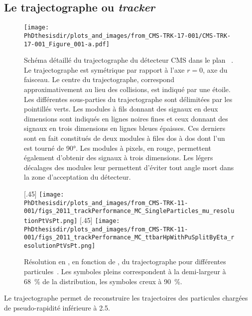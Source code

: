 \subsection{Le trajectographe ou \emph{tracker}}\label{chapter-LHC-section-CMS-subsec-tracker}
\begin{figure}[p]
\centering
\texttt{[image: \\PhDthesisdir/plots\_and\_images/from\_CMS-TRK-17-001/CMS-TRK-17-001\_Figure\_001-a.pdf]}
\caption[Schéma détaillé du trajectographe du détecteur CMS.]{Schéma détaillé du trajectographe du détecteur CMS dans le plan ~\cite{CMS-TRK-11-001,CMS-TRK-17-001}. Le trajectographe est symétrique par rapport à l'axe $r=0$, axe du faisceau. Le centre du trajectographe, correspond approximativement au lieu des collisions, est indiqué par une étoile. Les différentes sous-parties du trajectographe sont délimitées par les pointillés verts. Les modules à fils donnant des signaux en deux dimensions sont indiqués en lignes noires fines et ceux donnant des signaux en trois dimensions en lignes bleues épaisses. Ces derniers sont en fait constitués de deux modules à files dos à dos dont l'un est tourné de \ang{90}. Les modules à pixels, en rouge, permettent également d'obtenir des signaux à trois dimensions. Les légers décalages des modules leur permettent d'éviter tout angle mort dans la zone d'acceptation du détecteur.}
\label{fig-CMS-trk_detailed_scheme}
\end{figure}
\begin{figure}[p]
\centering
{}[.45\textwidth]
{\texttt{[image: \\PhDthesisdir/plots\_and\_images/from\_CMS-TRK-11-001/figs\_2011\_trackPerformance\_MC\_SingleParticles\_mu\_resolutionPtVsPt.png]}}
\hfill
{}[.45\textwidth]
{\texttt{[image: \\PhDthesisdir/plots\_and\_images/from\_CMS-TRK-11-001/figs\_2011\_trackPerformance\_MC\_ttbarHpWithPuSplitByEta\_resolutionPtVsPt.png]}}
\caption[Résolution en \pT\ du trajectographe.]{Résolution en \pT, en fonction de \pT, du trajectographe pour différentes particules~\cite{CMS-TRK-11-001}. Les symboles pleins correspondent à la demi-largeur à \SI{68}{\%} de la distribution, les symboles creux à \SI{90}{\%}.}
\label{fig-chapter-LHC-section-CMS-subsec-tracker-pT-resolution}
\end{figure}
Le trajectographe permet de reconstruire les trajectoires des particules chargées de pseudo-rapidité inférieure à \num{2.5}.
